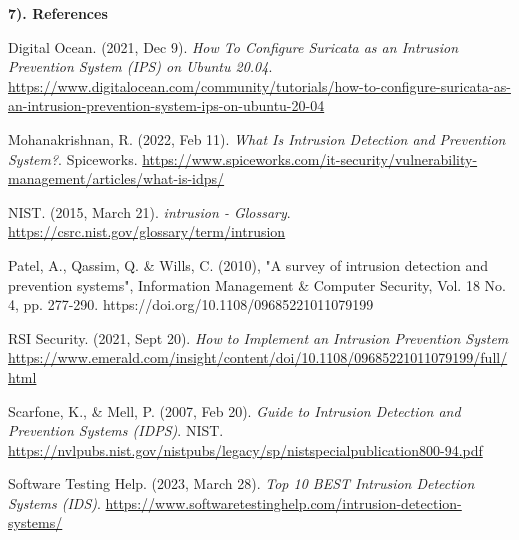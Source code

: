 \documentclass[12pt]{article}
\newcommand{\bibent}{\noindent \hangindent 40pt}
\newenvironment{workscited}{\newpage \textbf{7). References}}{\newpage }
\begin{document}
\begin{flushleft}
\newpage

\begin{workscited}

\bibent
Digital Ocean. (2021, Dec 9). \textit{How To Configure Suricata as an Intrusion Prevention System (IPS) on Ubuntu 20.04}. \href{https://www.digitalocean.com/community/tutorials/how-to-configure-suricata-as-an-intrusion-prevention-system-ips-on-ubuntu-20-04}{https://www.digitalocean.com/community/tutorials/how-to-configure-suricata-as-an-intrusion-prevention-system-ips-on-ubuntu-20-04}

\bibent
Mohanakrishnan, R. (2022, Feb 11). \textit{What Is Intrusion Detection and Prevention System?}. Spiceworks. \href{https://www.spiceworks.com/it-security/vulnerability-management/articles/what-is-idps/}{https://www.spiceworks.com/it-security/vulnerability-management/articles/what-is-idps/}

\bibent
NIST. (2015, March 21). \textit{intrusion - Glossary}. \href{https://csrc.nist.gov/glossary/term/intrusion}{https://csrc.nist.gov/glossary/term/intrusion}

\bibent
Patel, A., Qassim, Q. \& Wills, C. (2010), "A survey of intrusion detection and prevention systems", Information Management \& Computer Security, Vol. 18 No. 4, pp. 277-290. https://doi.org/10.1108/09685221011079199 

\bibent
RSI Security. (2021, Sept 20). \textit{How to Implement an Intrusion Prevention System} \href{https://blog.rsisecurity.com/how-to-implement-an-intrusion-prevention-system/}{https://www.emerald.com/insight/content/doi/10.1108/09685221011079199/full/html}

\bibent
Scarfone, K., \& Mell, P. (2007, Feb 20). \textit{Guide to Intrusion Detection and
Prevention Systems (IDPS)}. NIST. \href{https://nvlpubs.nist.gov/nistpubs/legacy/sp/nistspecialpublication800-94.pdf}{https://nvlpubs.nist.gov/nistpubs/legacy/sp/nistspecialpublication800-94.pdf}

\bibent
Software Testing Help. (2023, March 28). \textit{Top 10 BEST Intrusion Detection Systems (IDS)}. \href{https://www.softwaretestinghelp.com/intrusion-detection-systems/}{https://www.softwaretestinghelp.com/intrusion-detection-systems/}





\end{workscited}

\end{flushleft}
\end{document}
